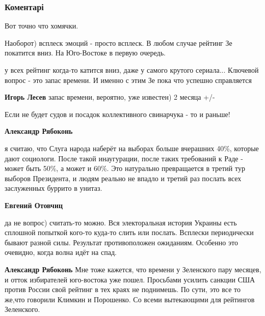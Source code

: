  
 
 
 
 
\subsubsection{Коментарі}
\label{sec:20_05_2019.fb.lesev_igor.1.zelenskii_jarko.cmt}

\begin{itemize} %
Вот точно что хомячки.

Наоборот) всплеск эмоций - просто всплеск. В любом случае рейтинг Зе покатится вниз. На Юго-Востоке в первую очередь.

\begin{itemize} %

у всех рейтинг когда-то катится вниз, даже у самого крутого сериала... Ключевой
вопрос - это запас времени. И именно с этим Зе пока что успешно справляется

\textbf{Игорь Лесев} запас времени, вероятно, уже известен) 2 месяца +/-

Если не будет судов и посадок коллективного свинарчука - то и раньше!

\textbf{Александр Рябоконь} 

я считаю, что Слуга народа наберёт на выборах больше вчерашних 40\%, которые
дают социологи. После такой инаугурации, после таких требований к Раде - может
быть 50\%, а может и 60\%. Это натурально превращается в третий тур выборов
Президента, и людям реально не впадло и третий раз послать всех заслуженных
буррито в унитаз.

\textbf{Евгений Отовчиц} 

да не вопрос) считать-то можно. Вся электоральная история Украины есть сплошной
попыткой кого-то куда-то слить или послать. Всплески периодически бывают разной
силы. Результат противоположен ожиданиям. Особенно это очевидно, когда волна
идёт на спад.

\textbf{Александр Рябоконь} Мне тоже кажется, что времени у Зеленского пару месяцев, и отток избирателей юго-востока уже пошел. Просьбами усилить санкции США против России свой рейтинг в тех краях не поднимешь. По сути, это все то же,что говорили Климкин и Порошенко. Со всеми вытекающими для рейтингов Зеленского.


\end{itemize}
\end{itemize}

